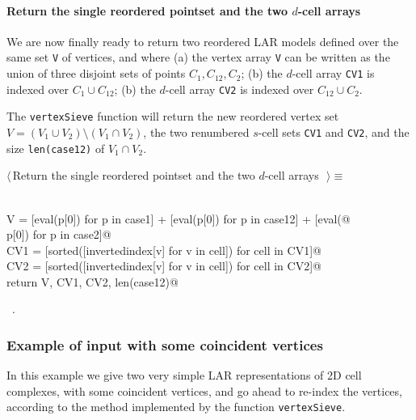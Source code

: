 \documentclass[11pt,oneside]{article}	%
\begin{document}
\paragraph{Return the single reordered pointset and the two $d$-cell arrays}
We are now finally ready to return two reordered LAR models defined over the same set \texttt{V} of vertices, and where (a) the vertex array \texttt{V} can be written as the union of three disjoint sets of points $C_1,C_{12},C_2$; (b) the $d$-cell array \texttt{CV1} is indexed over $C_1\cup C_{12}$; (b) the $d$-cell array \texttt{CV2} is indexed over $C_{12}\cup C_{2}$. 

The \texttt{vertexSieve} function will return the new reordered vertex set $V = (V_1 \cup V_2) \setminus (V_1 \cap V_2)$, the two renumbered $s$-cell sets \texttt{CV1} and \texttt{CV2}, and the size \texttt{len(case12)} of $V_1 \cap V_2$.
\begin{flushleft} \small \label{scrap8}
$\langle\,$Return the single reordered pointset and the two $d$-cell arrays\nobreak\ {\footnotesize {}}$\,\rangle\equiv$
\vspace{-1ex}
\begin{list}{}{} \item
\mbox{}\verb@@\\
\mbox{}\verb@   V = [eval(p[0]) for p in case1] + [eval(p[0]) for p in case12] + [eval(@\\
\mbox{}\verb@            p[0]) for p in case2]@\\
\mbox{}\verb@   CV1 = [sorted([invertedindex[v] for v in cell]) for cell in CV1]@\\
\mbox{}\verb@   CV2 = [sorted([invertedindex[v] for v in cell]) for cell in CV2]@\\
\mbox{}\verb@   return V, CV1, CV2, len(case12)@\\
\mbox{}\verb@@{\NWsep}
\end{list}
\vspace{-1ex}
\footnotesize\addtolength{\baselineskip}{-1ex}
\begin{list}{}{\setlength{\itemsep}{-\parsep}\setlength{\itemindent}{-\leftmargin}}
\item \NWtxtMacroRefIn\ .
\end{list}
\end{flushleft}


\subsubsection{Example of input with some coincident vertices}
In this example we give two very simple LAR representations of 2D cell complexes, with some coincident vertices, and go ahead to re-index the vertices, according to the method implemented by the function \texttt{vertexSieve}.
\end{document}
